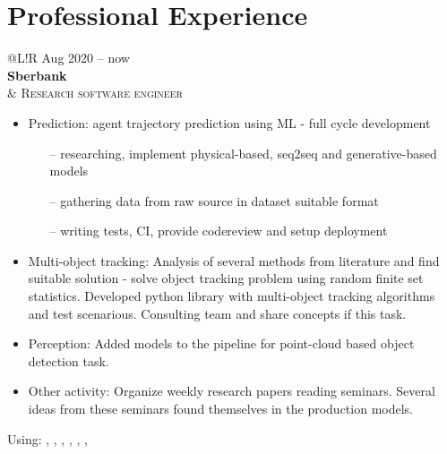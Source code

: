 \section*{Professional Experience}
\begin{tabular}{@{}L!{\VRule}R}
    Aug 2020 -- now                                                                                                       \\ {\bf Sberbank} \\  &
    {\textsc{Research software engineer}}
    \begin{itemize}
        \item Prediction: agent trajectory prediction using ML - full cycle development
        \begin{itemize}
            \item[--] researching, implement physical-based, seq2seq and generative-based models
            \item[--] gathering data from raw source in dataset suitable format
            \item[--] writing tests, CI, provide codereview and setup deployment 
        \end{itemize}
        \item Multi-object tracking: Analysis of several methods from literature and find suitable solution - solve object tracking problem using random finite set statistics. Developed python library with multi-object tracking algorithms and test scenarious. Consulting team and share concepts if this task.
        \item Perception: Added models to the pipeline for point-cloud based object detection task.
        \item Other activity: Organize weekly research papers reading seminars. Several ideas from these seminars found themselves in the production models.
    \end{itemize}
    Using: , , , , , ,                                                                                        \\
\end{tabular} 
